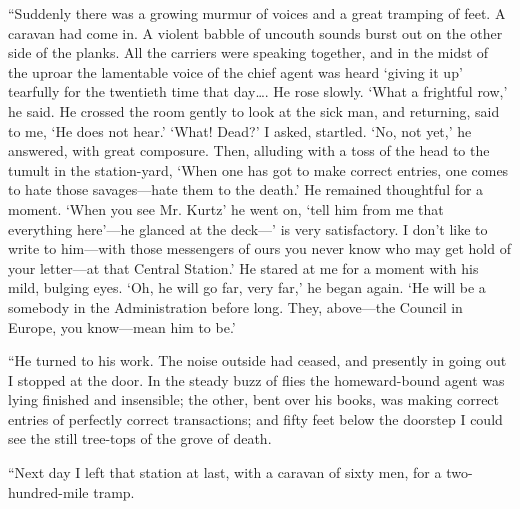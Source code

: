 \documentclass[12pt]{report}
\begin{document}
``Suddenly there was a growing murmur of voices and a great tramping of
feet. A caravan had come in. A violent babble of uncouth sounds burst
out on the other side of the planks. All the carriers were speaking
together, and in the midst of the uproar the lamentable voice of the
chief agent was heard `giving it up' tearfully for the twentieth time
that day\ldots{}. He rose slowly. `What a frightful row,' he said. He
crossed the room gently to look at the sick man, and returning, said to
me, `He does not hear.' `What! Dead?' I asked, startled. `No, not yet,'
he answered, with great composure. Then, alluding with a toss of the
head to the tumult in the station-yard, `When one has got to make
correct entries, one comes to hate those savages---hate them to the
death.' He remained thoughtful for a moment. `When you see Mr. Kurtz' he
went on, `tell him from me that everything here'---he glanced at the
deck---' is very satisfactory. I don't like to write to him---with those
messengers of ours you never know who may get hold of your letter---at
that Central Station.' He stared at me for a moment with his mild,
bulging eyes. `Oh, he will go far, very far,' he began again. `He will
be a somebody in the Administration before long. They, above---the
Council in Europe, you know---mean him to be.'

``He turned to his work. The noise outside had ceased, and presently in
going out I stopped at the door. In the steady buzz of flies the
homeward-bound agent was lying finished and insensible; the other, bent
over his books, was making correct entries of perfectly correct
transactions; and fifty feet below the doorstep I could see the still
tree-tops of the grove of death.

``Next day I left that station at last, with a caravan of sixty men, for
a two-hundred-mile tramp.
\end{document}
